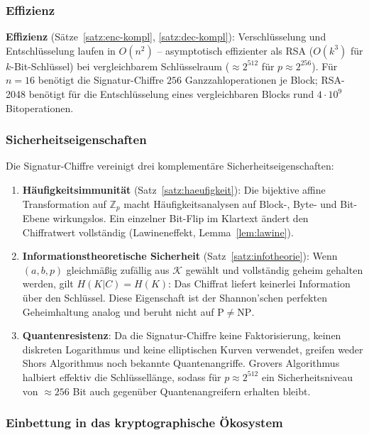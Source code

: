 ﻿\documentclass[a4paper,12pt]{scrreprt}
\theoremstyle{definition}
\begin{document}
\subsubsection{Effizienz}

\textbf{Effizienz} (Sätze~\ref{satz:enc-kompl}, \ref{satz:dec-kompl}): Verschlüsselung und Entschlüsselung laufen in $O(n^2)$ -- asymptotisch effizienter als RSA ($O(k^3)$ für $k$-Bit-Schlüssel) bei vergleichbarem Schlüsselraum ($\approx 2^{512}$ für $p \approx 2^{256}$). Für $n=16$ benötigt die Signatur-Chiffre $256$ Ganzzahloperationen je Block; RSA-2048 benötigt für die Entschlüsselung eines vergleichbaren Blocks rund $4 \cdot 10^9$ Bitoperationen.

\subsubsection{Sicherheitseigenschaften}

Die Signatur-Chiffre vereinigt drei komplementäre Sicherheitseigenschaften:

\begin{enumerate}
  \item \textbf{Häufigkeitsimmunität} (Satz~\ref{satz:haeufigkeit}): Die bijektive affine Transformation auf $\mathbb{Z}_p$ macht Häufigkeitsanalysen auf Block-, Byte- und Bit-Ebene wirkungslos. Ein einzelner Bit-Flip im Klartext ändert den Chiffratwert vollständig (Lawineneffekt, Lemma~\ref{lem:lawine}).
  \item \textbf{Informationstheoretische Sicherheit} (Satz~\ref{satz:infotheorie}): Wenn $(a,b,p)$ gleichmäßig zufällig aus $\mathcal{K}$ gewählt und vollständig geheim gehalten werden, gilt $H(K|C) = H(K)$: Das Chiffrat liefert keinerlei Information über den Schlüssel. Diese Eigenschaft ist der Shannon'schen perfekten Geheimhaltung analog und beruht nicht auf $\mathrm{P} \neq \mathrm{NP}$.
  \item \textbf{Quantenresistenz}: Da die Signatur-Chiffre keine Faktorisierung, keinen diskreten Logarithmus und keine elliptischen Kurven verwendet, greifen weder Shors Algorithmus \cite{Sho94} noch bekannte Quantenangriffe. Grovers Algorithmus \cite{Gro96} halbiert effektiv die Schlüssellänge, sodass für $p \approx 2^{512}$ ein Sicherheitsniveau von $\approx 256$ Bit auch gegenüber Quantenangreifern erhalten bleibt.
\end{enumerate}

\subsubsection{Einbettung in das kryptographische Ökosystem}
\end{document}
